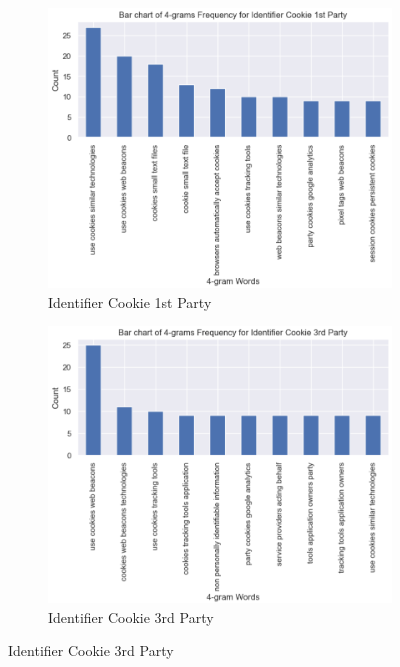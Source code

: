 \begin{figure}[!ht]
	\begin{subfigure}[t]{.5\textwidth}
	  \centering
	  \includegraphics[width=\linewidth]{figures/4_grams_cookie_1stParty.png}
	  \caption{Identifier Cookie 1st Party}
	\end{subfigure}
	\hfill
	\begin{subfigure}[t]{.5\textwidth}
	  \centering
	  \includegraphics[width=\linewidth]{figures/4_grams_cookie_3rdParty.png}
	  \caption{Identifier Cookie 3rd Party}
	\end{subfigure}
	

\end{figure}

